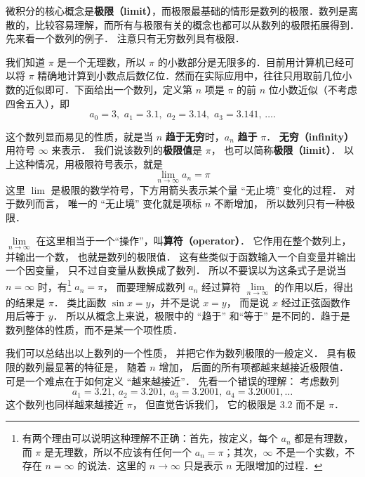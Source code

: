 
微积分的核心概念是\textbf{极限（limit）}，而极限最基础的情形是数列的极限．数列是离散的，比较容易理解，而所有与极限有关的概念也都可以从数列的极限拓展得到． 先来看一个数列的例子．  注意只有无穷数列具有极限．

\begin{example}{}\label{Lim0_ex1}
我们知道 $\pi$ 是一个无理数，所以 $\pi$ 的小数部分是无限多的．目前用计算机已经可以将 $\pi$ 精确地计算到小数点后数亿位．然而在实际应用中，往往只用取前几位小数的近似即可．下面给出一个数列，定义第 $n$ 项是 $\pi$ 的前 $n$ 位小数近似（不考虑四舍五入），即
\begin{equation}\label{Lim0_eq1}
a_0 = 3,\,\, a_1 = 3.1,\,\, a_2 = 3.14,\,\, a_3 = 3.141,\,\dots.
\end{equation}

这个数列显而易见的性质，就是当 $n$ \textbf{趋于无穷}时，$a_n$ \textbf{趋于} $\pi$． \textbf{无穷（infinity）}用符号 $\infty$ 来表示． 我们说该数列的\textbf{极限值}是 $\pi$， 也可以简称\textbf{极限（limit）}． 以上这种情况，用极限符号表示，就是
\begin{equation}
\lim_{n \to \infty } {a_n} = \pi 
\end{equation}
这里 $\lim$ 是极限的数学符号，下方用箭头表示某个量 “无止境” 变化的过程． 对于数列而言， 唯一的 “无止境” 变化就是项标 $n$ 不断增加， 所以数列只有一种极限．
\end{example}

$\lim\limits_{n \to \infty }$ 在这里相当于一个“操作”，叫\textbf{算符（operator）}． 它作用在整个数列上，并输出一个数， 也就是数列的极限值． 这有些类似于函数输入一个自变量并输出一个因变量， 只不过自变量从数换成了数列． 所以不要误以为这条式子是说当 $n = \infty$ 时，有\footnote{有两个理由可以说明这种理解不正确：首先，按定义，每个 $a_n$ 都是有理数，而 $\pi$ 是无理数，所以不应该有任何一个 $a_n=\pi$；其次，$\infty$ 不是一个实数，不存在 $n=\infty$ 的说法．这里的 $n\to\infty$ 只是表示 $n$ 无限增加的过程．} $a_n=\pi$， 而要理解成数列 $a_n$ 经过算符 $\lim\limits_{n \to \infty }$ 的作用以后，得出的结果是 $\pi$． 类比函数 $\sin x = y$，并不是说 $x=y$， 而是说 $x$ 经过正弦函数作用后等于 $y$． 所以从概念上来说，极限中的 “趋于” 和“等于” 是不同的．趋于是数列整体的性质，而不是某一个项性质．

我们可以总结出以上数列的一个性质， 并把它作为数列极限的一般定义． 具有极限的数列最显著的特征是， 随着 $n$ 增加， 后面的所有项都越来越接近极限值． 可是一个难点在于如何定义 “越来越接近”． 先看一个错误的理解： 考虑数列
\begin{equation}\label{Lim0_eq2}
a_1 = 3.21,\ a_2 = 3.201,\ a_3 = 3.2001,\ a_4 = 3.20001, \dots
\end{equation}
这个数列也同样越来越接近 $\pi$， 但直觉告诉我们， 它的极限是 $3.2$ 而不是 $\pi$．

